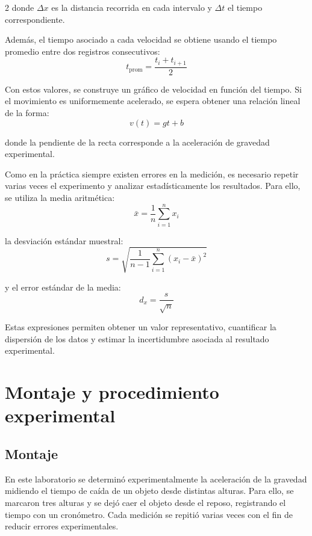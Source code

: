 \documentclass[11pt,letterpaper]{article}
\begin{document}
\begin{multicols}{2}
donde $\Delta x$ es la distancia recorrida en cada intervalo y $\Delta t$ el tiempo correspondiente.

Además, el tiempo asociado a cada velocidad se obtiene usando el tiempo promedio entre dos registros consecutivos:
\begin{equation}
t_{\text{prom}} = \frac{t_i + t_{i+1}}{2}
\end{equation}

Con estos valores, se construye un gráfico de velocidad en función del tiempo. Si el movimiento es uniformemente acelerado, se espera obtener una relación lineal de la forma:
\begin{equation}
v(t)=gt+b
\end{equation}

donde la pendiente de la recta corresponde a la aceleración de gravedad experimental.

Como en la práctica siempre existen errores en la medición, es necesario repetir varias veces el experimento y analizar estadísticamente los resultados. Para ello, se utiliza la media aritmética:
\begin{equation}
\bar{x}=\frac{1}{n}\sum_{i=1}^{n}x_i
\end{equation}

la desviación estándar muestral:
\begin{equation}
s=\sqrt{\frac{1}{n-1}\sum_{i=1}^{n}(x_i-\bar{x})^2}
\end{equation}

y el error estándar de la media:
\begin{equation}
d_x=\frac{s}{\sqrt{n}}
\end{equation}

Estas expresiones permiten obtener un valor representativo, cuantificar la dispersión de los datos y estimar la incertidumbre asociada al resultado experimental.

\section{Montaje y procedimiento experimental}

\subsection{Montaje}

En este laboratorio se determinó experimentalmente la aceleración de la gravedad midiendo el tiempo de caída de un objeto desde distintas alturas. Para ello, se marcaron tres alturas y se dejó caer el objeto desde el reposo, registrando el tiempo con un cronómetro. Cada medición se repitió varias veces con el fin de reducir errores experimentales.


\end{multicols}
\end{document}
